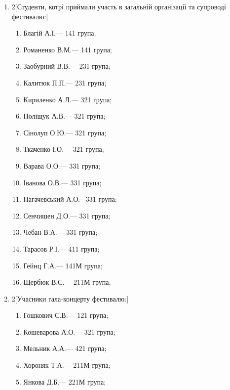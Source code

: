 \documentclass[
	a4paper,
	12pt,
	oneside,
	draft
]{extreport}
\begin{document}
\begin{enumerate}[topsep=0pt,itemsep=-1ex,partopsep=0ex,parsep=1ex]
\item 
\begin{multicols}{2}[Студенти, котрі приймали участь в загальній організації та супроводі фестивалю:] 
\begin{enumerate}[topsep=0pt,itemsep=-1ex,partopsep=0ex,parsep=1ex,label=\arabic*.]
\item Благій А.І.\hfill --- 141 група;
\item Романенко В.М.\hfill --- 141 група;
\item Заобурний В.В.\hfill --- 231 група;
\item Калитюк П.П.\hfill --- 231 група;
\item Кириленко А.Л.\hfill --- 321 група;
\item Поліщук А.В.\hfill --- 321 група;
\item Сінолуп О.Ю.\hfill --- 321 група;
\item Ткаченко І.О.\hfill --- 321 група;
\item Варава О.О.\hfill --- 331 група;
\item Іванова О.В.\hfill --- 331 група;
\item Нагачевський А.О.\hfill -- 331 група;
\item Сенчишен Д.О.\hfill --- 331 група;
\item Чебан В.А.\hfill --- 331 група;
\item Тарасов Р.І.\hfill --- 411 група;
\item Гейнц Г.А.\hfill --- 141М група;
\item Щербюк В.С.\hfill --- 211М група;
\end{enumerate}
\end{multicols}

\item 
\begin{multicols}{2}[Учасники гала-концерту фестивалю:] 
\begin{enumerate}[topsep=0pt,itemsep=-1ex,partopsep=0ex,parsep=1ex,label=\arabic*.]
\item Гошкович С.В.\hfill --- 121 група;
\item Кошеварова А.О.\hfill --- 321 група;
\item Мельник А.А.\hfill --- 421 група;
\item Хороняк Т.А.\hfill --- 211М група;
\item Янкова Д.Б.\hfill --- 221М група;
\end{enumerate}
\end{multicols}


\end{enumerate}
\end{document}
